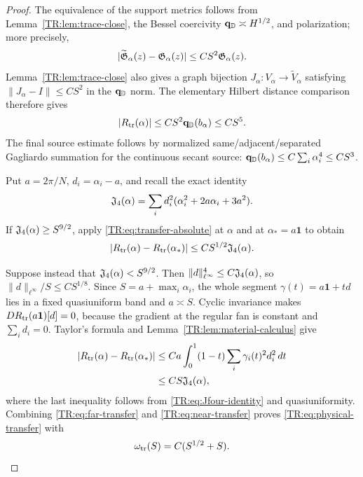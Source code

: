 \begin{proof}
The equivalence of the support metrics follows from
Lemma~\ref{TR:lem:trace-close}, the Bessel coercivity
$\mathbf q_{\mathbb D}\asymp H^{1/2}$, and polarization; more precisely,
\begin{equation}\label{TR:eq:metric-equivalence}
 |\widetilde{\mathfrak G}_\alpha(z)-\mathfrak G_\alpha(z)|
 \le CS^2\mathfrak G_\alpha(z).
\end{equation}
Lemma~\ref{TR:lem:trace-close} also gives a graph bijection
$J_\alpha:V_\alpha\to\widetilde V_\alpha$ satisfying
$\|J_\alpha-I\|\le CS^2$ in the $\mathbf q_{\mathbb D}$ norm.  The elementary Hilbert
distance comparison therefore gives
\begin{equation}\label{TR:eq:transfer-absolute}
 |R_{\rm tr}(\alpha)|
 \le CS^2\mathbf q_{\mathbb D}(b_\alpha)\le CS^5.
\end{equation}
The final source estimate follows by normalized same/adjacent/separated
Gagliardo summation for the continuous secant source:
$\mathbf q_{\mathbb D}(b_\alpha)\le C\sum_i\alpha_i^4\le CS^3$.

Put $a=2\pi/N$, $d_i=\alpha_i-a$, and recall the exact identity
\begin{equation}\label{TR:eq:Jfour-identity}
 \mathfrak J_4(\alpha)=
 \sum_i d_i^2(\alpha_i^2+2a\alpha_i+3a^2).
\end{equation}
If $\mathfrak J_4(\alpha)\ge S^{9/2}$, apply
\eqref{TR:eq:transfer-absolute} at $\alpha$ and at
$\alpha_*=a\mathbf1$ to obtain
\begin{equation}\label{TR:eq:far-transfer}
 |R_{\rm tr}(\alpha)-R_{\rm tr}(\alpha_*)|
 \le CS^{1/2}\mathfrak J_4(\alpha).
\end{equation}

Suppose instead that $\mathfrak J_4(\alpha)<S^{9/2}$.  Then
$\|d\|_{\ell^\infty}^4\le C\mathfrak J_4(\alpha)$, so
$\|d\|_{\ell^\infty}/S\le CS^{1/8}$.  Since
$S=a+\max_i\alpha_i$, the whole segment
$\gamma(t)=a\mathbf1+td$ lies in a fixed quasiuniform band and
$a\asymp S$.  Cyclic invariance makes
$DR_{\rm tr}(a\mathbf1)[d]=0$, because the gradient at the regular fan
is constant and $\sum_i d_i=0$.  Taylor's formula and
Lemma~\ref{TR:lem:material-calculus} give
\begin{align}
 |R_{\rm tr}(\alpha)-R_{\rm tr}(\alpha_*)|
 &\le Ca\int_0^1(1-t)
       \sum_i\gamma_i(t)^2d_i^2\,dt\notag\\
 &\le CS\mathfrak J_4(\alpha),
 \label{TR:eq:near-transfer}
\end{align}
where the last inequality follows from
\eqref{TR:eq:Jfour-identity} and quasiuniformity.  Combining
\eqref{TR:eq:far-transfer} and \eqref{TR:eq:near-transfer} proves
\eqref{TR:eq:physical-transfer} with
\begin{equation}\label{TR:eq:transfer-modulus}
 \omega_{\rm tr}(S)=C(S^{1/2}+S).
\end{equation}
\end{proof}

